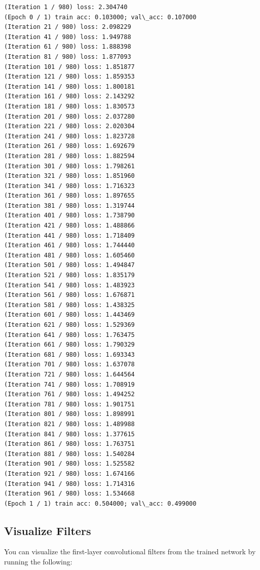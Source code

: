 \documentclass[11pt]{article}
\begin{document}
    \begin{Verbatim}[commandchars=\\\{\}]
(Iteration 1 / 980) loss: 2.304740
(Epoch 0 / 1) train acc: 0.103000; val\_acc: 0.107000
(Iteration 21 / 980) loss: 2.098229
(Iteration 41 / 980) loss: 1.949788
(Iteration 61 / 980) loss: 1.888398
(Iteration 81 / 980) loss: 1.877093
(Iteration 101 / 980) loss: 1.851877
(Iteration 121 / 980) loss: 1.859353
(Iteration 141 / 980) loss: 1.800181
(Iteration 161 / 980) loss: 2.143292
(Iteration 181 / 980) loss: 1.830573
(Iteration 201 / 980) loss: 2.037280
(Iteration 221 / 980) loss: 2.020304
(Iteration 241 / 980) loss: 1.823728
(Iteration 261 / 980) loss: 1.692679
(Iteration 281 / 980) loss: 1.882594
(Iteration 301 / 980) loss: 1.798261
(Iteration 321 / 980) loss: 1.851960
(Iteration 341 / 980) loss: 1.716323
(Iteration 361 / 980) loss: 1.897655
(Iteration 381 / 980) loss: 1.319744
(Iteration 401 / 980) loss: 1.738790
(Iteration 421 / 980) loss: 1.488866
(Iteration 441 / 980) loss: 1.718409
(Iteration 461 / 980) loss: 1.744440
(Iteration 481 / 980) loss: 1.605460
(Iteration 501 / 980) loss: 1.494847
(Iteration 521 / 980) loss: 1.835179
(Iteration 541 / 980) loss: 1.483923
(Iteration 561 / 980) loss: 1.676871
(Iteration 581 / 980) loss: 1.438325
(Iteration 601 / 980) loss: 1.443469
(Iteration 621 / 980) loss: 1.529369
(Iteration 641 / 980) loss: 1.763475
(Iteration 661 / 980) loss: 1.790329
(Iteration 681 / 980) loss: 1.693343
(Iteration 701 / 980) loss: 1.637078
(Iteration 721 / 980) loss: 1.644564
(Iteration 741 / 980) loss: 1.708919
(Iteration 761 / 980) loss: 1.494252
(Iteration 781 / 980) loss: 1.901751
(Iteration 801 / 980) loss: 1.898991
(Iteration 821 / 980) loss: 1.489988
(Iteration 841 / 980) loss: 1.377615
(Iteration 861 / 980) loss: 1.763751
(Iteration 881 / 980) loss: 1.540284
(Iteration 901 / 980) loss: 1.525582
(Iteration 921 / 980) loss: 1.674166
(Iteration 941 / 980) loss: 1.714316
(Iteration 961 / 980) loss: 1.534668
(Epoch 1 / 1) train acc: 0.504000; val\_acc: 0.499000

    \end{Verbatim}

    \hypertarget{visualize-filters}{%
\subsection{Visualize Filters}\label{visualize-filters}}

You can visualize the first-layer convolutional filters from the trained
network by running the following:
\end{document}

